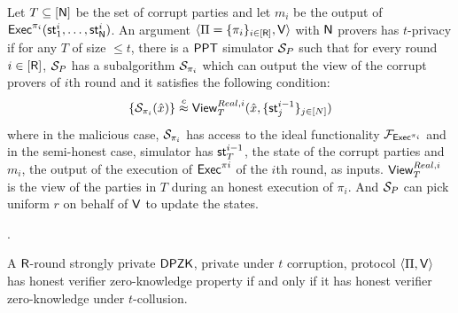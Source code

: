 \begin{definition}
	Let $T\subseteq [\mathsf{N}]$ be the set of corrupt parties and let $m_i$ be the output of $\mathsf{Exec}^{\pi_i}(\mathsf{st}^i_1, \ldots, \mathsf{st}^i_{\mathsf{N}})$. An argument $\langle \Pi = \{\pi_i\}_{i \in [\mathsf{R}]},\mathsf{V}\rangle$ with $\mathsf{N}$ provers has $t$-privacy if for any $T$ of size $\leq t$, there is a $\mathsf{PPT}$ simulator $\mathcal{S}_{P}$ such that for every round $i \in [\mathsf{R}]$, $\mathcal{S}_{P}$ has a subalgorithm  $\mathcal{S}_{\pi_i}$ which can output the view of the corrupt provers of  $i$th round and it satisfies the following condition: 
	\[
	\{ \mathcal{S}_{\pi_i} (\hat{x}) \} \stackrel{c}{\approx}  \mathsf{View}^{Real, i}_T ( \hat{x}, \{\mathsf{st}^{i-1}_j\}_{j \in [N]}) 
	\]
	where in the malicious case, $\mathcal{S}_{\pi_{i}}$ has access to the ideal functionality $\mathcal{F}_{\mathsf{Exec}^{\pi_i}}$ and in the semi-honest case, simulator has $\mathsf{st}^{i-1}_T$, the state of the corrupt parties and $m_i$, the output of the execution of $\mathsf{Exec}^{\pi{i}}$ of the $i$th round, as inputs. $\mathsf{View}^{Real, i}_T$ is the view of the parties in $T$ during an honest execution of $\pi_i$.
	And $\mathcal{S}_P$ can pick uniform $r$ on behalf of $\mathsf{V}$ to update the states.
\end{definition}
.






\begin{theorem}\label{theo:equivalent}
	A $\mathsf{R}$-round strongly private $\mathsf{DPZK}$, private under $t$ corruption, protocol $\langle \Pi,\mathsf{V}\rangle$ has honest verifier zero-knowledge property if and only if it has honest verifier zero-knowledge under $t$-collusion.
\end{theorem}

